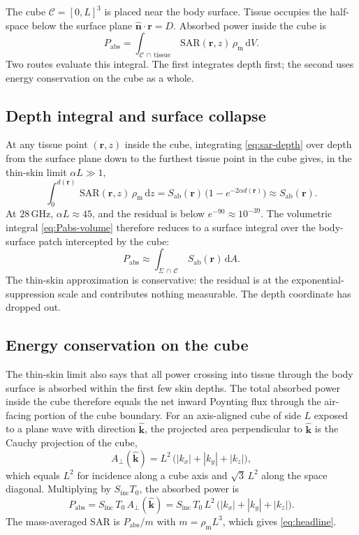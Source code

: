 \documentclass[journal,twocolumn,10pt]{IEEEtran}
\theoremstyle{plain}
\theoremstyle{remark}
\newcommand{\khat}{\hat{\bm{k}}}
\newcommand{\nhat}{\hat{\bm{n}}}
\newcommand{\rr}{\mathbf{r}}
\newcommand{\Sinc}{S_{\mathrm{inc}}}
\newcommand{\Sab}{S_{\mathrm{ab}}}
\newcommand{\Aproj}{A_\perp}
\newcommand{\rhom}{\rho_{\mathrm{m}}}
\newcommand{\diff}{\mathrm{d}}
\begin{document}
The cube $\mathcal{C} = [0,L]^3$ is placed near the body surface.
Tissue occupies the half-space below the surface plane
$\nhat \cdot \rr = D$. Absorbed power inside the cube is
\begin{equation}\label{eq:Pabs-volume}
  P_{\mathrm{abs}}
  = \int_{\mathcal{C}\,\cap\,\text{tissue}}\,
    \mathrm{SAR}(\rr,z)\, \rhom\, \diff V.
\end{equation}
Two routes evaluate this integral. The first integrates depth first;
the second uses energy conservation on the cube as a whole.

\subsection{Depth integral and surface collapse}
At any tissue point $(\rr, z)$ inside the cube, integrating
\eqref{eq:sar-depth} over depth from the surface plane down to the
furthest tissue point in the cube gives, in the thin-skin limit
$\alpha L \gg 1$,
\begin{equation}\label{eq:depth-collapse}
  \int_0^{d(\rr)}\, \mathrm{SAR}(\rr, z)\, \rhom\, \diff z
  = \Sab(\rr)\, \bigl(1 - e^{-2 \alpha d(\rr)}\bigr)
  \approx \Sab(\rr).
\end{equation}
At $28\,$GHz, $\alpha L \approx 45$, and the residual is below
$e^{-90} \approx 10^{-39}$. The volumetric integral
\eqref{eq:Pabs-volume} therefore reduces to a surface integral over
the body-surface patch intercepted by the cube:
\begin{equation}\label{eq:Pabs-surface}
  P_{\mathrm{abs}} \approx
  \int_{\Sigma\, \cap\, \mathcal{C}}\, \Sab(\rr)\, \diff A.
\end{equation}
The thin-skin approximation is conservative: the residual is at the
exponential-suppression scale and contributes nothing measurable.
The depth coordinate has dropped out.

\subsection{Energy conservation on the cube}
The thin-skin limit also says that all power crossing into tissue
through the body surface is absorbed within the first few skin
depths. The total absorbed power inside the cube therefore equals
the net inward Poynting flux through the air-facing portion of the
cube boundary. For an axis-aligned cube of side $L$ exposed to a
plane wave with direction $\khat$, the projected area perpendicular
to $\khat$ is the Cauchy projection of the cube,
\begin{equation}\label{eq:Aproj-cube}
  \Aproj(\khat) = L^2\, \bigl(|k_x| + |k_y| + |k_z|\bigr),
\end{equation}
which equals $L^2$ for incidence along a cube axis and
$\sqrt{3}\, L^2$ along the space diagonal. Multiplying by
$\Sinc T_0$, the absorbed power is
\begin{equation}\label{eq:Pabs-energy}
  P_{\mathrm{abs}} = \Sinc \, T_0 \, \Aproj(\khat)
  = \Sinc \, T_0 \, L^2 \,
    \bigl(|k_x|+|k_y|+|k_z|\bigr).
\end{equation}
The mass-averaged SAR is $P_{\mathrm{abs}} / m$ with
$m = \rhom L^3$, which gives \eqref{eq:headline}.
\end{document}

